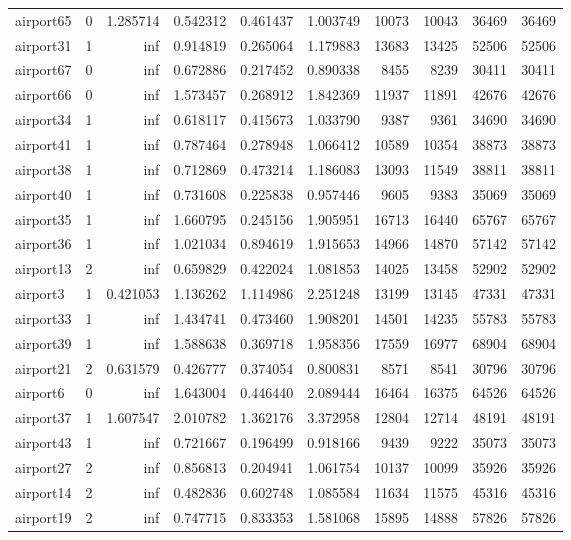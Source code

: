 \begin{longtable}{|l|r|r|r|r|r|r|r|r|r|}
airport65 & 0 & 1.285714 & 0.542312 & 0.461437 & 1.003749 & 10073 & 10043 & 36469 & 36469 \\
airport31 & 1 & inf & 0.914819 & 0.265064 & 1.179883 & 13683 & 13425 & 52506 & 52506 \\
airport67 & 0 & inf & 0.672886 & 0.217452 & 0.890338 & 8455 & 8239 & 30411 & 30411 \\
airport66 & 0 & inf & 1.573457 & 0.268912 & 1.842369 & 11937 & 11891 & 42676 & 42676 \\
airport34 & 1 & inf & 0.618117 & 0.415673 & 1.033790 & 9387 & 9361 & 34690 & 34690 \\
airport41 & 1 & inf & 0.787464 & 0.278948 & 1.066412 & 10589 & 10354 & 38873 & 38873 \\
airport38 & 1 & inf & 0.712869 & 0.473214 & 1.186083 & 13093 & 11549 & 38811 & 38811 \\
airport40 & 1 & inf & 0.731608 & 0.225838 & 0.957446 & 9605 & 9383 & 35069 & 35069 \\
airport35 & 1 & inf & 1.660795 & 0.245156 & 1.905951 & 16713 & 16440 & 65767 & 65767 \\
airport36 & 1 & inf & 1.021034 & 0.894619 & 1.915653 & 14966 & 14870 & 57142 & 57142 \\
airport13 & 2 & inf & 0.659829 & 0.422024 & 1.081853 & 14025 & 13458 & 52902 & 52902 \\
airport3 & 1 & 0.421053 & 1.136262 & 1.114986 & 2.251248 & 13199 & 13145 & 47331 & 47331 \\
airport33 & 1 & inf & 1.434741 & 0.473460 & 1.908201 & 14501 & 14235 & 55783 & 55783 \\
airport39 & 1 & inf & 1.588638 & 0.369718 & 1.958356 & 17559 & 16977 & 68904 & 68904 \\
airport21 & 2 & 0.631579 & 0.426777 & 0.374054 & 0.800831 & 8571 & 8541 & 30796 & 30796 \\
airport6 & 0 & inf & 1.643004 & 0.446440 & 2.089444 & 16464 & 16375 & 64526 & 64526 \\
airport37 & 1 & 1.607547 & 2.010782 & 1.362176 & 3.372958 & 12804 & 12714 & 48191 & 48191 \\
airport43 & 1 & inf & 0.721667 & 0.196499 & 0.918166 & 9439 & 9222 & 35073 & 35073 \\
airport27 & 2 & inf & 0.856813 & 0.204941 & 1.061754 & 10137 & 10099 & 35926 & 35926 \\
airport14 & 2 & inf & 0.482836 & 0.602748 & 1.085584 & 11634 & 11575 & 45316 & 45316 \\
airport19 & 2 & inf & 0.747715 & 0.833353 & 1.581068 & 15895 & 14888 & 57826 & 57826 \\

\end{longtable}

